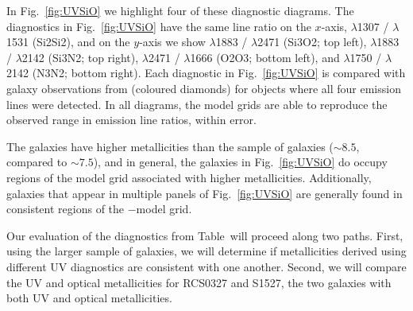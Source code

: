 In Fig.~\ref{fig:UVSiO} we highlight four of these diagnostic diagrams. The diagnostics in Fig.~\ref{fig:UVSiO} have the same line ratio on the $x$-axis, \SiuII$\lambda$1307 / \SiuII$\lambda$1531 (Si2Si2), and on the $y$-axis we show \SiuIII$\lambda$1883 / \oii$\lambda$2471  (Si3O2; top left), \SiuIII$\lambda$1883 / \nii$\lambda$2142 (Si3N2; top right), \oii$\lambda$2471 / \oiii$\lambda$1666 (O2O3; bottom left), and \niii$\lambda$1750 / \nii$\lambda$2142 (N3N2; bottom right). Each diagnostic in Fig.~\ref{fig:UVSiO} is compared with \mage galaxy observations from \citet{Rigby+2018b} (coloured diamonds) for objects where all four emission lines were detected. In all diagrams, the model grids are able to reproduce the observed range in emission line ratios, within error.

The \mage galaxies have higher metallicities than the \citet{Berg+2016} sample of galaxies (\logOH${\sim}8.5$, compared to \logOH${\sim}7.5$), and in general, the \mage galaxies in Fig.~\ref{fig:UVSiO} do occupy regions of the model grid associated with higher metallicities. Additionally, galaxies that appear in multiple panels of Fig.~\ref{fig:UVSiO} are generally found in consistent regions of the \logU$-$\logZ model grid.





Our evaluation of the diagnostics from Table~\XXX will proceed along two paths. First, using the larger sample of \mage galaxies, we will determine if metallicities derived using different UV diagnostics are consistent with one another. Second, we will compare the UV and optical metallicities for RCS0327 and S1527, the two \mage galaxies with both UV and optical metallicities.

